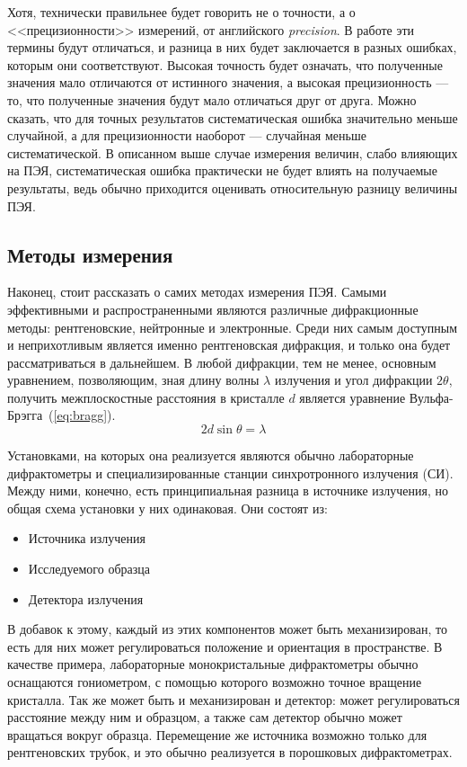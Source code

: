 \documentclass[a4paper,14pt]{extarticle}
\newcounter{x}
\begin{document}
Хотя, технически правильнее будет говорить не о точности, а о <<прецизионности>> измерений, от английского \textit{precision}.
В работе эти термины будут отличаться, и разница в них будет заключается в разных ошибках, которым они соответствуют.
Высокая точность будет означать, что полученные значения мало отличаются от истинного значения, а высокая прецизионность --- то, что полученные значения будут мало отличаться друг от друга.
Можно сказать, что для точных результатов систематическая ошибка значительно меньше случайной, а для прецизионности наоборот --- случайная меньше систематической.
В описанном выше случае измерения величин, слабо влияющих на ПЭЯ, систематическая ошибка практически не будет влиять на получаемые результаты, ведь обычно приходится оценивать относительную разницу величины ПЭЯ.

\subsection{Методы измерения}

Наконец, стоит рассказать о самих методах измерения ПЭЯ.
Самыми эффективными и распространенными являются различные дифракционные методы: рентгеновские, нейтронные и электронные.
Среди них самым доступным и неприхотливым является именно рентгеновская дифракция, и только она будет рассматриваться в дальнейшем.
В любой дифракции, тем не менее, основным уравнением, позволяющим, зная длину волны $\lambda$ излучения и угол дифракции $2\theta$, получить межплоскостные расстояния в кристалле $d$ является уравнение Вульфа-Брэгга~(\ref{eq:bragg}).
\begin{equation} \label{eq:bragg} 
    2 d \sin{\theta} = \lambda
\end{equation}

Установками, на которых она реализуется являются обычно лабораторные дифрактометры и специализированные станции синхротронного излучения (СИ).
Между ними, конечно, есть принципиальная разница в источнике излучения, но общая схема установки у них одинаковая.
Они состоят из:
\begin{itemize}
    \item Источника излучения
    \item Исследуемого образца
    \item Детектора излучения
\end{itemize}
В добавок к этому, каждый из этих компонентов может быть механизирован, то есть для них может регулироваться положение и ориентация в пространстве.
В качестве примера, лабораторные монокристальные дифрактометры обычно оснащаются гониометром, с помощью которого возможно точное вращение кристалла.
Так же может быть и механизирован и детектор: может регулироваться расстояние между ним и образцом, а также сам детектор обычно может вращаться вокруг образца.
Перемещение же источника возможно только для рентгеновских трубок, и это обычно реализуется в порошковых дифрактометрах.
\end{document}

